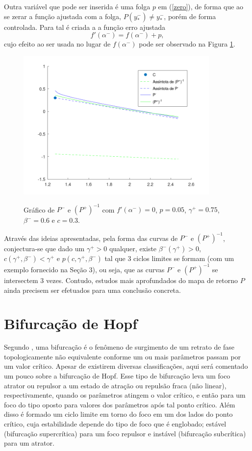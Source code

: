 Outra variável que pode ser inserida é uma folga $p$ em (\ref{zero}), de forma que ao se zerar a função ajustada com a folga, $P(y^-_*)\neq y^-_*$, porém de forma controlada. Para tal é criada a a função erro ajustada
\begin{equation}
\label{zero3}
f'\left( \alpha^-\right)=f\left( \alpha^-\right)+p,
\end{equation}
cujo efeito ao ser usada no lugar de $f\left( \alpha^-\right)$ pode ser observado na Figura \ref{folga}.
\begin{figure}[H]
\centering
\includegraphics[width=10cm]{folga}\\
\vspace{\baselineskip}
\caption{\label{folga}Gráfico de $P^-$ e $(P^+)^{-1}$ com $f'\left( \alpha^-\right)=0$, $p=0.05$, $\gamma^+=0.75$, $\beta^-=0.6$ e $ c=0.3$.}
\end{figure}
Através das ideias apresentadas, pela forma das curvas de $P^-$ e $(P^+)^{-1}$, conjectura-se que dado um $\gamma^+>0$ qualquer, existe $ \beta^-(\gamma^+)>0$, $c(\gamma^+, \beta^-)<\gamma^+$ e $p(c, \gamma^+, \beta^-)$ tal que 3 ciclos limites se formam (com um exemplo fornecido na Seção 3), ou seja, que as curvas $P^-$ e $(P^+)^{-1}$ se intersectem 3 vezes. Contudo, estudos mais aprofundados do mapa de retorno $P$ ainda precisem ser efetuados para uma conclusão concreta.

\section{Bifurcação de Hopf}
Segundo \cite{Kuznetsov:1998}, uma bifurcação é o fenômeno de surgimento de um retrato de fase topologicamente não equivalente conforme um ou mais parâmetros passam por um valor crítico. Apesar de existirem diversas classificações, aqui será comentado um pouco sobre a bifurcação de Hopf. Esse tipo de bifurcação leva um foco atrator ou repulsor a um estado de atração ou repulsão fraca (não linear), respectivamente, quando os parâmetros atingem o valor crítico, e então para um foco do tipo oposto para valores dos parâmetros após tal ponto crítico. Além disso é formado um ciclo limite em torno do foco em um dos lados do ponto crítico, cuja estabilidade depende do tipo de foco que é englobado; estável (bifurcação supercrítica) para um foco repulsor e instável (bifurcação subcrítica) para um atrator. 

